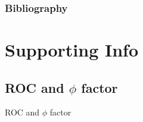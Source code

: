 \documentclass{beamer}
\begin{document}
\begin{frame}[t,allowframebreaks]
\frametitle{Bibliography}
\printbibliography
\end{frame}


\section{Supporting Info}

\subsection{ROC and $\phi$ factor}
\begin{frame}{}
\begin{center}
{\Huge ROC and $\phi$ factor}
\end{center}
\end{frame}
\end{document}
